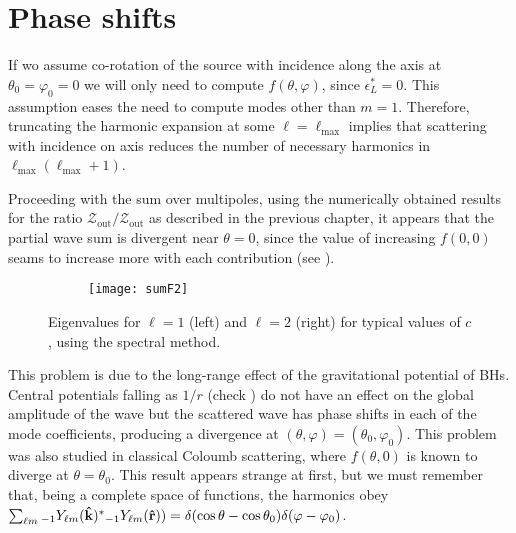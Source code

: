 
\section{Phase shifts}

If wo assume co-rotation of the source with incidence along the axis at $\theta_0=\varphi_0=0$ we will only need to compute $f(\theta,\varphi)$, since $\epsilon_L^*=0$.
This assumption eases the need to compute modes other than $m=1$.
Therefore, truncating the harmonic expansion  at some $\ell=\ell_{\max}$ implies that scattering with incidence on axis reduces the number of necessary harmonics in $\ell_{\max}(\ell_{\max} + 1)$.

Proceeding with the sum over multipoles, using the numerically obtained results for the ratio $\mathscr{Z}_\mathrm{out}/\mathscr{Z}_\mathrm{out}$ as described in the previous chapter, it appears that the partial wave sum is divergent near $\theta = 0$, since the value of increasing $f(0,0)$ seams to increase more with each contribution (see ).
\begin{figure}[h]
	\centering
	\vspace{0.2cm}
	\begin{subfigure}[c]{0.6\textwidth}
        \texttt{[image: sumF2]}
	\end{subfigure}
	\caption{Eigenvalues for $\ell=1$ (left) and $\ell=2$ (right) for typical values of $c$, using the spectral method.}
	\label{fig5:sumF}
\end{figure}
This problem is due to the long-range effect of the gravitational potential of BHs. Central potentials falling as $1/r$ (check ) do not have an effect on the global amplitude of the wave but the scattered wave has phase shifts in each of the mode coefficients, producing a divergence at $(\theta,\varphi)=(\theta_0,\varphi_0)$.
This problem was also studied in classical Coloumb scattering, where $f(\theta,0)$ is known to diverge at $\theta=\theta_0$.
This result appears strange at first, but we must remember that, being a complete space of functions, the harmonics obey $\sum_{\ell m} \uu[-1]{Y}{\ell m}(\mathbf{\hat{k}})^{*} \uu[-1]{Y}{\ell m}(\mathbf{\hat{r}})) = \delta(\cos\theta - \cos\theta_0) \delta(\varphi - \varphi_0)$.

